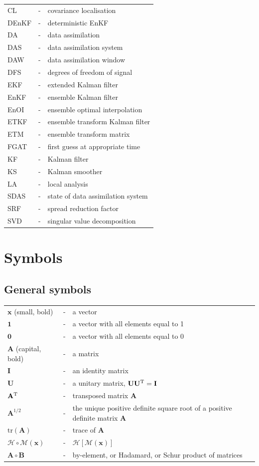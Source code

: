 \documentclass[11pt]{report}
\newcommand{\mb} {\mathbf}
\newcommand{\T}{^{\tiny \mathrm T}}
\begin{document}
\begin{tabular}{lll}
  CL &-& covariance localisation \\
  DEnKF &-& deterministic EnKF \\
  DA &-& data assimilation \\
  DAS &-& data assimilation system \\
  DAW &-& data assimilation window \\
  DFS &-& degrees of freedom of signal \\
  EKF &-& extended Kalman filter \\
  EnKF &-& ensemble Kalman filter \\
  EnOI &-& ensemble optimal interpolation \\
  ETKF &-& ensemble transform Kalman filter \\
  ETM &-& ensemble transform matrix \\
  FGAT &-& first guess at appropriate time \\
  KF &-& Kalman filter \\
  KS &-& Kalman smoother \\
  LA &-& local analysis \\
  SDAS &-& state of data assimilation system \\
  SRF &-& spread reduction factor \\
  SVD &-& singular value decomposition \\
\end{tabular}

\clearpage

\chapter*{Symbols}

\section*{General symbols}
\begin{tabular}{lll}
  $\mb x$ (small, bold) &-& a vector \\
  $\mb 1$ &-& a vector with all elements equal to 1 \\
  $\mb 0$ &-& a vector with all elements equal to 0 \\
  $\mb A$ (capital, bold) &-& a matrix \\
  $\mb I$ &-& an identity matrix \\
  $\mb U$ &-& a unitary matrix, $\mb U \mb U\T = \mb I$ \\
  $\mb A\T$ &-& transposed matrix $\mb A$ \\
  $\mb A^{1/2}$ &-& the unique positive definite square root of a positive definite matrix $\mb A$ \\
  $\mathrm{tr}(\mb A)$ &-& trace of $\mb A$ \\
  $\mathcal H \circ \mathcal M(\mb x)$ &-& $\mathcal H \left[ \mathcal M (\mb x) \right]$ \\
  $\mb A \circ \mb B$ &-& by-element, or Hadamard, or Schur product of matrices
\end{tabular}
\end{document}
